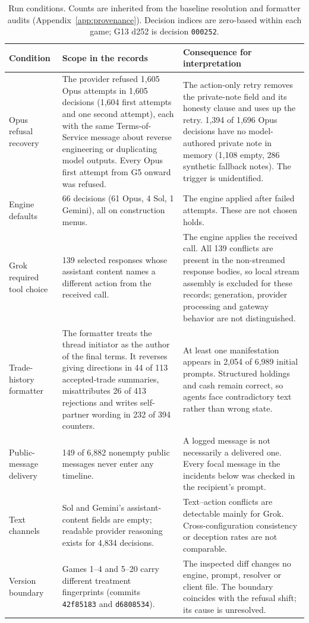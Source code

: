 \begin{table}[htbp]
\centering\small
\begin{tabularx}{\linewidth}{@{}L{2.75cm}L{4.6cm}Y@{}}
\toprule
Condition & Scope in the records & Consequence for interpretation\\
\midrule
Opus refusal recovery & The provider refused 1,605 Opus attempts in 1,605 decisions (1,604 first attempts and one second attempt), each with the same Terms-of-Service message about reverse engineering or duplicating model outputs. Every Opus first attempt from G5 onward was refused. & The action-only retry removes the private-note field and its honesty clause and uses up the retry. 1,394 of 1,696 Opus decisions have no model-authored private note in memory (1,108 empty, 286 synthetic fallback notes). The trigger is unidentified.\\
Engine defaults & 66 decisions (61 Opus, 4 Sol, 1 Gemini), all on construction menus. & The engine applied \End{} after failed attempts. These are not chosen holds.\\
Grok required tool choice & 139 selected responses whose assistant content names a different action from the received call. & The engine applies the received call. All 139 conflicts are present in the non-streamed response bodies, so local stream assembly is excluded for these records; generation, provider processing and gateway behavior are not distinguished.\\
Trade-history formatter & The formatter treats the thread initiator as the author of the final terms. It reverses giving directions in 44 of 113 accepted-trade summaries, misattributes 26 of 413 rejections and writes self-partner wording in 232 of 394 counters. & At least one manifestation appears in 2,054 of 6,989 initial prompts. Structured holdings and cash remain correct, so agents face contradictory text rather than wrong state.\\
Public-message delivery & 149 of 6,882 nonempty public messages never enter any timeline. & A logged message is not necessarily a delivered one. Every focal message in the incidents below was checked in the recipient's prompt.\\
Text channels & Sol and Gemini's assistant-content fields are empty; readable provider reasoning exists for 4,834 decisions. & Text--action conflicts are detectable mainly for Grok. Cross-configuration consistency or deception rates are not comparable.\\
Version boundary & Games 1--4 and 5--20 carry different treatment fingerprints (commits \texttt{42f85183} and \texttt{d6808534}). & The inspected diff changes no engine, prompt, resolver or client file. The boundary coincides with the refusal shift; its cause is unresolved.\\
\bottomrule
\end{tabularx}
\caption{Run conditions. Counts are inherited from the baseline resolution and formatter audits (Appendix~\ref{app:provenance}). Decision indices are zero-based within each game; G13 d252 is decision \texttt{000252}.}
\label{tab:conditions}
\end{table}

